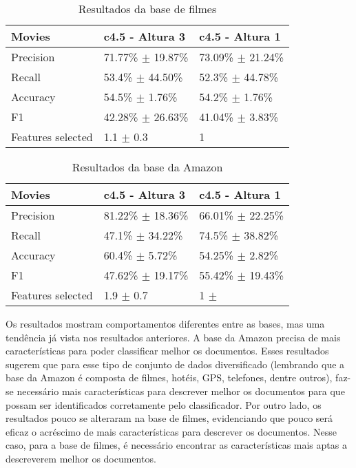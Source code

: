  \begin{table}[!h]
    \begin{tabular}{lll}
    Movies         				 & c4.5 - Altura 3                                 	 	 & c4.5 - Altura 1                               \\ \hline
    Precision                   & 71.77\% $\pm$ 19.87\% 			 & 73.09\% $\pm$ 21.24\% \\
    Recall                        & 53.4\% $\pm$ 44.50\% 		 & 52.3\% $\pm$ 44.78\% \\
    Accuracy                   & 54.5\% $\pm$ 1.76\% 			 & 54.2\% $\pm$ 1.76\% \\
    F1                  			 & 42.28\% $\pm$ 26.63\% 	     & 41.04\% $\pm$ 3.83\% \\
    Features selected      & 1.1 $\pm$ 0.3            			 & 1                                     \\
    \end{tabular}
    \caption{Resultados da base de filmes}
	\label{table:movies_h3}
\end{table}

\begin{table}[!h]
    \begin{tabular}{lll}
    Movies         					& c4.5 - Altura 3                          		& c4.5 - Altura 1                              \\ \hline
    Precision                     & 81.22\% $\pm$ 18.36\% 		& 66.01\% $\pm$ 22.25\%  \\
    Recall                          & 47.1\% $\pm$ 34.22\% 		& 74.5\% $\pm$ 38.82\% \\
    Accuracy                     & 60.4\% $\pm$ 5.72\% 			& 54.25\% $\pm$ 2.82\% \\
    F1                                & 47.62\% $\pm$ 19.17\% 	& 55.42\% $\pm$ 19.43\% \\
    Features selected 		& 1.9 $\pm$ 0.7               		& 1 $\pm$                                  \\
    \end{tabular}
    \caption{Resultados da base da Amazon}
	\label{table:amazon_h3}
\end{table}

Os resultados mostram comportamentos diferentes entre as bases, mas uma tendência já vista nos resultados anteriores. A base da Amazon precisa de mais características para poder classificar melhor os documentos. Esses resultados sugerem que para esse tipo de conjunto de dados diversificado (lembrando que a base da Amazon é composta de filmes, hotéis, GPS, telefones, dentre outros), faz-se necessário mais características para descrever melhor os documentos para que possam ser identificados corretamente pelo classificador. Por outro lado, os resultados pouco se alteraram na base de filmes, evidenciando que pouco será eficaz o acréscimo de mais características para descrever os documentos. Nesse caso, para a base de filmes, é necessário encontrar as características mais aptas a descreverem melhor os documentos. 

